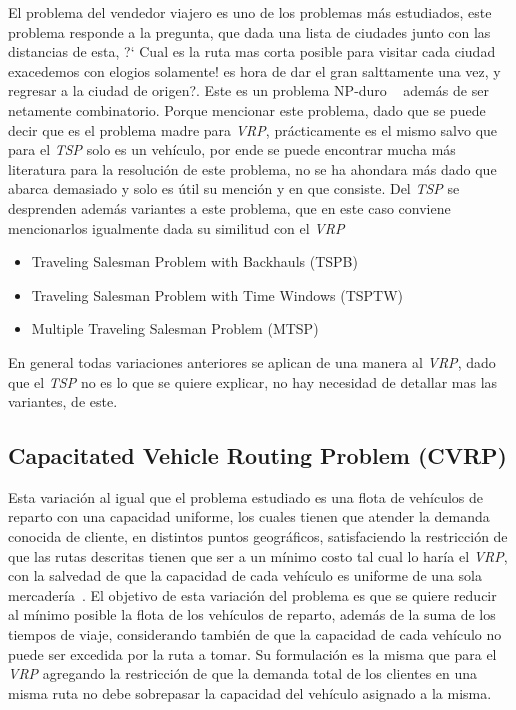 \documentclass[letter, 10pt]{article}
\begin{document}
El problema del vendedor viajero es uno de los problemas m\'as estudiados, 
este problema responde a la pregunta, que dada una lista de ciudades 
junto con las distancias de esta, ?` Cual es la ruta mas corta posible 
para visitar cada ciudad exacedemos con elogios solamente! es hora de dar el gran salttamente una vez, y regresar a la ciudad de origen?. 
Este es un problema NP-duro ~\cite{TSP} adem\'as de ser netamente combinatorio. 
Porque mencionar este problema, dado que se puede decir que
es el problema madre para \emph{VRP}, pr\'acticamente es el mismo salvo que para el 
\emph{TSP} solo es un veh\'iculo, por ende se puede encontrar mucha m\'as literatura para 
la resoluci\'on de este problema, no se ha ahondara m\'as dado que abarca demasiado y solo 
es \'util su menci\'on y en que consiste.
\newline
Del \emph{TSP} se desprenden adem\'as variantes a este problema, que en este caso conviene 
mencionarlos igualmente dada su similitud con el \emph{VRP} ~\cite{TSP}

\begin{itemize}
 \item Traveling Salesman Problem with Backhauls (TSPB)
 \item Traveling Salesman Problem with Time Windows (TSPTW)
 \item Multiple Traveling Salesman Problem (MTSP)
\end{itemize}

En general todas variaciones anteriores se aplican de una manera al \emph{VRP}, dado que el \emph{TSP} no es lo que se quiere explicar, no hay necesidad de
detallar mas las variantes, de este.

\subsection{Capacitated Vehicle Routing Problem (CVRP)}
Esta variaci\'on al igual que el problema estudiado es una flota de veh\'iculos de reparto con una capacidad uniforme, los cuales 
tienen que atender la demanda conocida de cliente, en distintos puntos geogr\'aficos, satisfaciendo la restricci\'on de que las rutas descritas tienen
que ser a un m\'inimo costo tal cual lo har\'ia el \emph{VRP}, con la salvedad de que la capacidad de cada veh\'iculo es 
uniforme de una sola mercader\'ia~\cite{CVRP}.
\newline
El objetivo de esta variaci\'on del problema es que se quiere reducir al m\'inimo posible la flota de los veh\'iculos de reparto, adem\'as 
de la suma de los tiempos de viaje, considerando tambi\'en de que la capacidad de cada veh\'iculo no puede ser excedida por la ruta a tomar.
Su formulaci\'on es la misma que para el \emph{VRP} agregando la restricci\'on de que la demanda total de los clientes en una misma ruta
no debe sobrepasar la capacidad del veh\'iculo asignado a la misma.
\end{document}
